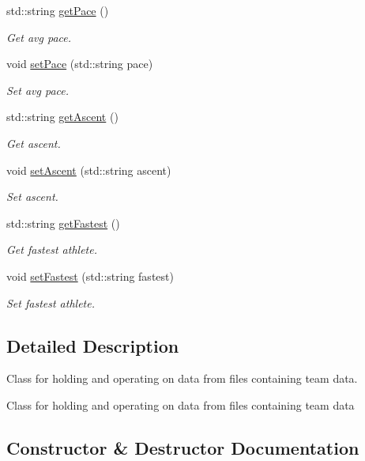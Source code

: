 \begin{DoxyCompactItemize}
std\+::string \mbox{\hyperlink{classTeamDataContainer_a7dd8ccaf5098d02168c1862cf096af0a}{get\+Pace}} ()
\begin{DoxyCompactList}\small\item\em Get avg pace. \end{DoxyCompactList}\item 
void \mbox{\hyperlink{classTeamDataContainer_a27fea3f0b0b1ec40cb135766bf8481a4}{set\+Pace}} (std\+::string pace)
\begin{DoxyCompactList}\small\item\em Set avg pace. \end{DoxyCompactList}\item 
std\+::string \mbox{\hyperlink{classTeamDataContainer_ad4cdbb0a46c78363973fceab697f1032}{get\+Ascent}} ()
\begin{DoxyCompactList}\small\item\em Get ascent. \end{DoxyCompactList}\item 
void \mbox{\hyperlink{classTeamDataContainer_af402d96fc75382c8940789ec5d7bbc0d}{set\+Ascent}} (std\+::string ascent)
\begin{DoxyCompactList}\small\item\em Set ascent. \end{DoxyCompactList}\item 
std\+::string \mbox{\hyperlink{classTeamDataContainer_a23f2fc37602f797d79181ddcb1a0f6ed}{get\+Fastest}} ()
\begin{DoxyCompactList}\small\item\em Get fastest athlete. \end{DoxyCompactList}\item 
void \mbox{\hyperlink{classTeamDataContainer_ae572464dfbc81211c04997069b39e526}{set\+Fastest}} (std\+::string fastest)
\begin{DoxyCompactList}\small\item\em Set fastest athlete. \end{DoxyCompactList}\end{DoxyCompactItemize}


\subsection{Detailed Description}
Class for holding and operating on data from files containing team data. 

Class for holding and operating on data from files containing team data 

\subsection{Constructor \& Destructor Documentation}
\mbox{\label{classTeamDataContainer_a33e2abdd44e4a58ce37641483de8887d}} 
